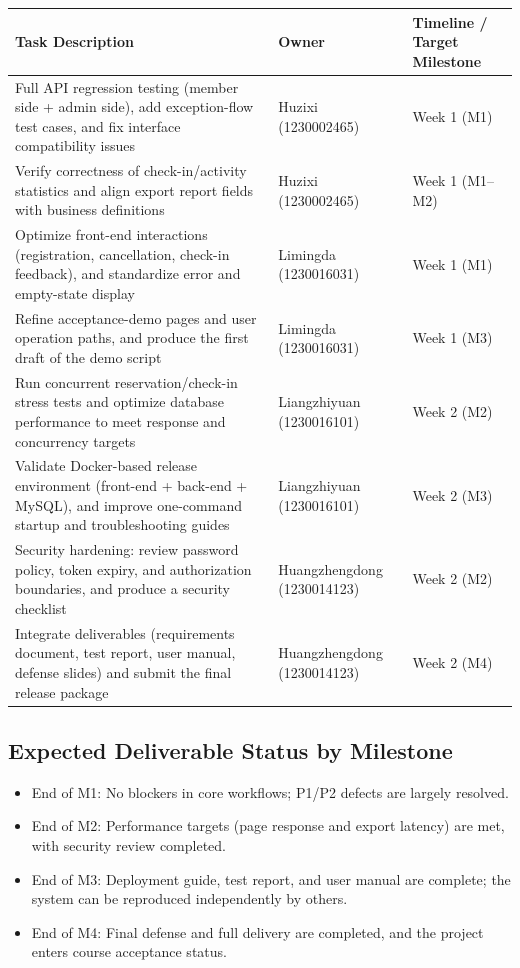 \renewcommand{\arraystretch}{1.25}
\begin{tabular}{|p{6.8cm}|p{3.2cm}|p{4.2cm}|}
\hline
\textbf{Task Description} & \textbf{Owner} & \textbf{Timeline / Target Milestone} \\
\hline
Full API regression testing (member side + admin side), add exception-flow test cases, and fix interface compatibility issues & Huzixi (1230002465) & Week 1 (M1) \\
\hline
Verify correctness of check-in/activity statistics and align export report fields with business definitions & Huzixi (1230002465) & Week 1 (M1--M2) \\
\hline
Optimize front-end interactions (registration, cancellation, check-in feedback), and standardize error and empty-state display & Limingda (1230016031) & Week 1 (M1) \\
\hline
Refine acceptance-demo pages and user operation paths, and produce the first draft of the demo script & Limingda (1230016031) & Week 1 (M3) \\
\hline
Run concurrent reservation/check-in stress tests and optimize database performance to meet response and concurrency targets & Liangzhiyuan (1230016101) & Week 2 (M2) \\
\hline
Validate Docker-based release environment (front-end + back-end + MySQL), and improve one-command startup and troubleshooting guides & Liangzhiyuan (1230016101) & Week 2 (M3) \\
\hline
Security hardening: review password policy, token expiry, and authorization boundaries, and produce a security checklist & Huangzhengdong (1230014123) & Week 2 (M2) \\
\hline
Integrate deliverables (requirements document, test report, user manual, defense slides) and submit the final release package & Huangzhengdong (1230014123) & Week 2 (M4) \\
\hline
\end{tabular}

\subsection{Expected Deliverable Status by Milestone}

\begin{itemize}
  \item End of M1: No blockers in core workflows; P1/P2 defects are largely resolved.
  \item End of M2: Performance targets (page response and export latency) are met, with security review completed.
  \item End of M3: Deployment guide, test report, and user manual are complete; the system can be reproduced independently by others.
  \item End of M4: Final defense and full delivery are completed, and the project enters course acceptance status.
\end{itemize}

